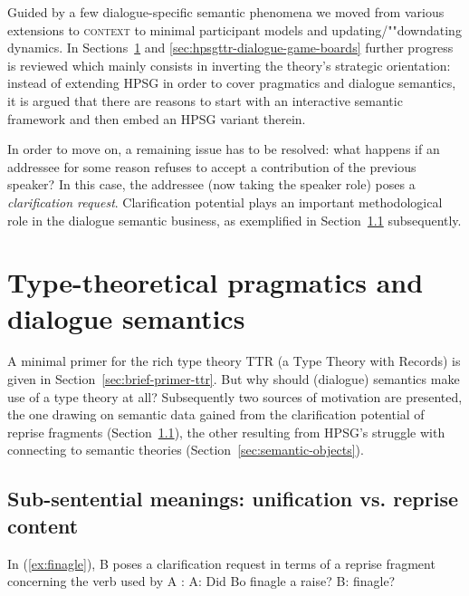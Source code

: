 \documentclass[output=paper]{langsci/langscibook}
\begin{document}
{Guided by a few dialogue-specific semantic phenomena we moved from various extensions to \textsc{context}  to minimal participant models and updating/""downdating dynamics.
%
In Sections~\ref{sec:type-theory-pragmatics-semantics} and \ref{sec:hpsgttr-dialogue-game-boards} further progress is reviewed which mainly consists in inverting the theory's strategic orientation: instead of extending HPSG in order to cover pragmatics and dialogue semantics, it is argued that there are reasons to start with an interactive semantic framework and then embed an HPSG variant therein.


In order to move on, a remaining issue has to be resolved: what happens if an addressee for some reason refuses to accept a contribution of the previous speaker?
%
In this case, the addressee (now taking the speaker role) poses a \emph{clarification request}. 
%
Clarification potential  plays an important methodological role in the dialogue semantic business, as exemplified in Section~\ref{sec:sub-sentential-meanings} subsequently. 




\section{Type-theoretical pragmatics and dialogue semantics}
\label{sec:type-theory-pragmatics-semantics}

A minimal primer for the rich type theory TTR (a Type Theory with Records) is given in Section~\ref{sec:brief-primer-ttr}. 
%
But why should (dialogue) semantics make use of a type theory at all?
%
Subsequently two sources of motivation are presented, the one drawing on semantic data gained from the clarification potential of reprise fragments (Section~\ref{sec:sub-sentential-meanings}), the other resulting from HPSG's struggle with connecting to semantic theories (Section~\ref{sec:semantic-objects}).



  
\subsection{Sub-sentential meanings: unification vs. reprise content}
\label{sec:sub-sentential-meanings}

In (\ref{ex:finagle}), B poses a clarification request in terms of a reprise fragment concerning the verb used by A \citep[]{Ginzburg:2012}:
%
\ea \label{ex:finagle}
A: Did Bo finagle a raise? B: finagle?
\z

}
\end{document}
